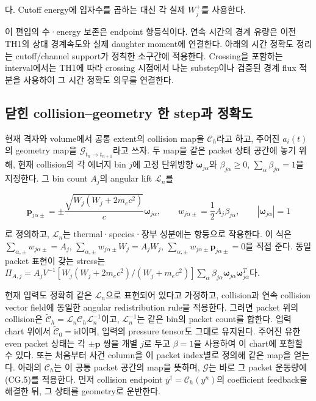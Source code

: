 다. Cutoff energy에 입자수를 곱하는 대신 각 실제 \(W_j^+\)를 사용한다.

이 편입의 수·energy 보존은 endpoint 항등식이다. 연속 시간의 경계 유량은 이전 TH1의 상대 경계속도와 실제 daughter moment에 연결한다. 아래의 시간 정확도 정리는 cutoff/channel support가 정칙한 소구간에 적용한다. Crossing을 포함하는 interval에서는 TH1에 따라 crossing 시점에서 나눈 substep이나 검증된 경계 flux 적분을 사용하여 그 시간 정확도 의무를 연결한다.

\hypertarget{uxb2ebuxd78c-collisiongeometry-uxd55c-stepuxacfc-uxc815uxd655uxb3c4}{%
\subsection{닫힌 collision--geometry 한 step과 정확도}\label{uxb2ebuxd78c-collisiongeometry-uxd55c-stepuxacfc-uxc815uxd655uxb3c4}}

현재 격자와 volume에서 공통 extent의 collision map을 \(\mathcal C_h\)라고 하고, 주어진 \(a_i(t)\)의 geometry map을 \(\mathcal G_{t_n\to t_{n+1}}\)라고 쓰자. 두 map을 같은 packet 상태 공간에 놓기 위해, 현재 collision의 각 에너지 bin \(j\)에 고정 단위방향 \(\boldsymbol\omega_{j\alpha}\)와 \(\beta_{j\alpha}\ge0\), \(\sum_\alpha\beta_{j\alpha}=1\)을 지정한다. 그 bin count \(A_j\)의 angular lift \(\mathcal L_n\)를

\[
\boldsymbol p_{j\alpha\pm}
=\pm\frac{\sqrt{W_j(W_j+2m_ec^2)}}{c}\boldsymbol\omega_{j\alpha},
\qquad
w_{j\alpha\pm}=\frac12A_j\beta_{j\alpha},
\qquad |\boldsymbol\omega_{j\alpha}|=1
\tag{CG.L1}
\]

로 정의하고, \(\mathcal L_n\)는 thermal·species·장부 성분에는 항등으로 작용한다. 이 식은 \(\sum_{\alpha,\pm}w_{j\alpha\pm}=A_j\), \(\sum_{\alpha,\pm}w_{j\alpha\pm}W_j=A_jW_j\), \(\sum_{\alpha,\pm}w_{j\alpha\pm}\boldsymbol p_{j\alpha\pm}=0\)을 직접 준다. 동일 packet 표현이 갖는 stress는 \(\Pi_{A,j}=A_jV^{-1}[W_j(W_j+2m_ec^2)/(W_j+m_ec^2)] \sum_\alpha\beta_{j\alpha}\boldsymbol\omega_{j\alpha}\boldsymbol\omega_{j\alpha}^{T}\)다.

현재 입력도 정확히 같은 \(\mathcal L_n\)으로 표현되어 있다고 가정하고, collision과 연속 collision vector field에 동일한 angular redistribution rule을 적용한다. 그러면 packet 위의 collision은 \(\widetilde{\mathcal C}_h=\mathcal L_n\mathcal C_h\mathcal L_n^{-1}\)이고, \(\mathcal L_n^{-1}\)는 같은 bin의 packet count를 합한다. 입력 chart 위에서 \(\widetilde{\mathcal C}_0=\mathrm{id}\)이며, 입력의 pressure tensor도 그대로 유지된다. 주어진 유한 even packet 상태는 각 \(\pm\boldsymbol p\) 쌍을 개별 \(j\)로 두고 \(\beta=1\)을 사용하여 이 chart에 포함할 수 있다. 또는 처음부터 사건 column을 이 packet index별로 정의해 같은 map을 얻는다. 아래의 \(\mathcal C_h\)는 이 공통 packet 공간의 map을 뜻하며, \(\mathcal G\)는 바로 그 packet 운동량에 (CG.5)를 적용한다. 먼저 collision endpoint \(y^\dagger=\mathcal C_h(y^n)\)의 coefficient feedback을 해결한 뒤, 그 상태를 geometry로 운반한다.

